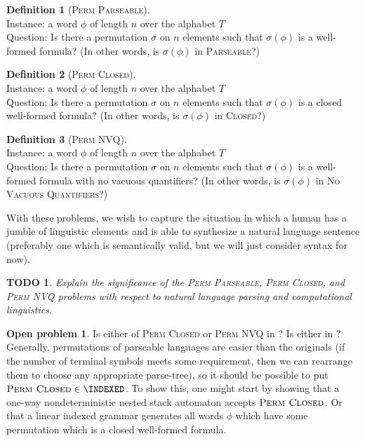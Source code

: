 \documentclass{article}
\newtheorem{todo}{TODO}
\theoremstyle{definition}
\newtheorem{definition}{Definition}
\newtheorem{openproblem}{Open problem}
\newcommand{\CLOSED}{\textsc{Closed}}
\newcommand{\PARSEABLE}{\textsc{Parseable}}
\newcommand{\NVQ}{\textsc{No Vacuous Quantifiers}}
\newcommand{\pp}{\textsc{Perm Parseable}}
\newcommand{\pc}{\textsc{Perm Closed}}
\newcommand{\pn}{\textsc{Perm NVQ}}
\newenvironment{langdef}[1]{\begin{definition}[#1]\mbox{}}{\end{definition}}
\newenvironment{instance}{\\Instance:}{}
\newenvironment{question}{\\Question:}{}
\begin{document}
\begin{langdef}{\pp}
  \begin{instance}
    a word $\phi$ of length $n$ over the alphabet $T$
  \end{instance}
  \begin{question}
    Is there a permutation $\sigma$ on $n$ elements such that $\sigma(\phi)$ is a well-formed formula?
    (In other words, is $\sigma(\phi)$ in \PARSEABLE?)
  \end{question}
\end{langdef}

\begin{langdef}{\pc}
  \begin{instance}
    a word $\phi$ of length $n$ over the alphabet $T$
  \end{instance}
  \begin{question}
    Is there a permutation $\sigma$ on $n$ elements such that $\sigma(\phi)$ is a closed well-formed formula?
    (In other words, is $\sigma(\phi)$ in \CLOSED?)
  \end{question}
\end{langdef}

\begin{langdef}{\pn}
  \begin{instance}
    a word $\phi$ of length $n$ over the alphabet $T$
  \end{instance}
  \begin{question}
    Is there a permutation $\sigma$ on $n$ elements such that $\sigma(\phi)$ is a well-formed formula with no vacuous quantifiers?
    (In other words, is $\sigma(\phi)$ in \NVQ?)
  \end{question}
\end{langdef}

With these problems, we wish to capture the situation in which a human has a jumble of linguistic elements and is able to synthesize a natural language sentence (preferably one which is semantically valid, but we will just consider syntax for now).

\begin{todo}
  Explain the significance of the \pp, \pc, and \pn{} problems with respect to natural language parsing and computational linguistics.
\end{todo}

\begin{openproblem}
  Is either of \pc{} or \pn{} in \INDEXED?
  Is either in \MCSL?
  Generally, permutations of parseable languages are easier than the originals (if the number of terminal symbols meets some requirement, then we can rearrange them to choose any appropriate parse-tree), so it should be possible to put $\pc \in \INDEXED$.
  To show this, one might start by showing that a one-way nondeterministic nested stack automaton accepts $\pc$.
  Or that a linear indexed grammar generates all words $\phi$ which have some permutation which is a closed well-formed formula.
\end{openproblem}
\end{document}
